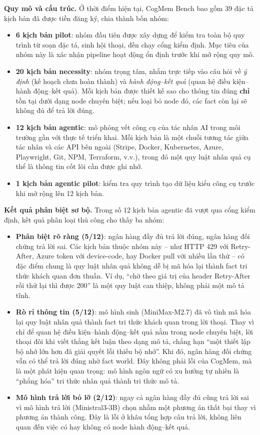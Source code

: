 \documentclass[../main.tex]{subfiles}
\begin{document}
\textbf{Quy mô và cấu trúc.} Ở thời điểm hiện tại, CogMem Bench bao gồm 39 đặc tả kịch bản đã được tiền đăng ký, chia thành bốn nhóm:

\begin{itemize}
    \item \textbf{6 kịch bản pilot}: nhóm đầu tiên được xây dựng để kiểm tra toàn bộ quy trình từ soạn đặc tả, sinh hội thoại, đến chạy cổng kiểm định. Mục tiêu của nhóm này là xác nhận pipeline hoạt động ổn định trước khi mở rộng quy mô.
    \item \textbf{20 kịch bản necessity}: nhóm trọng tâm, nhắm trực tiếp vào câu hỏi về \textit{ý định} (kế hoạch chưa hoàn thành) và \textit{hành động--kết quả} (quan hệ điều kiện--hành động--kết quả). Mỗi kịch bản được thiết kế sao cho thông tin đúng \textbf{chỉ} tồn tại dưới dạng node chuyên biệt; nếu loại bỏ node đó, các fact còn lại sẽ không đủ để trả lời đúng.
    \item \textbf{12 kịch bản agentic}: mô phỏng vết công cụ của tác nhân AI trong môi trường gần với thực tế triển khai. Mỗi kịch bản là một chuỗi tương tác giữa tác nhân và các API bên ngoài (Stripe, Docker, Kubernetes, Azure, Playwright, Git, NPM, Terraform, v.v.), trong đó một quy luật nhân quả cụ thể là thông tin cốt lõi cần được ghi nhớ.
    \item \textbf{1 kịch bản agentic pilot}: kiểm tra quy trình tạo dữ liệu kiểu công cụ trước khi mở rộng lên 12 kịch bản.
\end{itemize}

\textbf{Kết quả phân biệt sơ bộ.} Trong số 12 kịch bản agentic đã vượt qua cổng kiểm định, kết quả phân loại thủ công cho thấy ba nhóm:

\begin{itemize}
    \item \textbf{Phân biệt rõ ràng (5/12)}: ngân hàng đầy đủ trả lời đúng, ngân hàng đối chứng trả lời sai. Các kịch bản thuộc nhóm này -- như HTTP 429 với Retry-After, Azure token với device-code, hay Docker pull với nhiều lần thử -- có đặc điểm chung là quy luật nhân quả không dễ bị mã hóa lại thành fact tri thức khách quan đơn thuần. Ví dụ, ``chờ theo giá trị của header Retry-After rồi thử lại thì được 200'' là một quy luật can thiệp, không phải một mô tả tĩnh.
    \item \textbf{Rò rỉ thông tin (5/12)}: mô hình sinh (MiniMax-M2.7) đã vô tình mã hóa lại quy luật nhân quả thành fact tri thức khách quan trong lời thoại. Thay vì chỉ để quan hệ điều kiện--hành động--kết quả nằm trong node chuyên biệt, lời thoại đôi khi viết thẳng kết luận theo dạng mô tả, chẳng hạn ``một thiết lập bộ nhớ lớn hơn đã giải quyết lỗi thiếu bộ nhớ''. Khi đó, ngân hàng đối chứng vẫn có thể trả lời đúng nhờ fact world. Đây không phải lỗi của CogMem, mà là một phát hiện quan trọng: mô hình ngôn ngữ có xu hướng tự nhiên là ``phẳng hóa'' tri thức nhân quả thành tri thức mô tả.
    \item \textbf{Mô hình trả lời bỏ lỡ (2/12)}: ngay cả ngân hàng đầy đủ cũng trả lời sai vì mô hình trả lời (Ministral3-3B) chọn nhầm một phương án thất bại thay vì phương án thành công. Đây là lỗi ở khâu tổng hợp câu trả lời, không liên quan đến việc có hay không có node hành động--kết quả.
\end{itemize}
\end{document}
